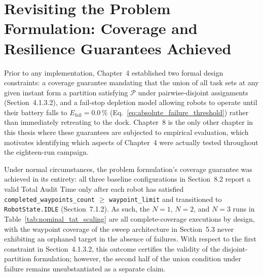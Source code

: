 \section{Revisiting the Problem Formulation: Coverage and Resilience Guarantees Achieved\label{sec:ch9_revisit}}

Prior to any implementation, Chapter~4 established two formal design constraints: a coverage guarantee mandating that the union of all task sets at any given instant form a partition satisfying $\mathcal{P}$ under pairwise-disjoint assignments (Section~4.1.3.2), and a fail-stop depletion model allowing robots to operate until their battery falls to $E_{\text{fail}} = 0.0\,\%$ (Eq.~\eqref{eq:absolute_failure_threshold}) rather than immediately retreating to the dock. Chapter~8 is the only other chapter in this thesis where these guarantees are subjected to empirical evaluation, which motivates identifying which aspects of Chapter~4 were actually tested throughout the eighteen-run campaign.

Under normal circumstances, the problem formulation's coverage guarantee was achieved in its entirety: all three baseline configurations in Section~8.2 report a valid Total Audit Time only after each robot has satisfied \texttt{completed\_waypoints\_count} $\ge$ \texttt{waypoint\_limit} and transitioned to \texttt{RobotState.IDLE} (Section~7.1.2). As such, the $N=1$, $N=2$, and $N=3$ runs in Table~\ref{tab:nominal_tat_scaling} are all complete-coverage executions by design, with the waypoint coverage of the sweep architecture in Section~5.3 never exhibiting an orphaned target in the absence of failures. With respect to the first constraint in Section~4.1.3.2, this outcome certifies the validity of the disjoint-partition formulation; however, the second half of the union condition under failure remains unsubstantiated as a separate claim.


